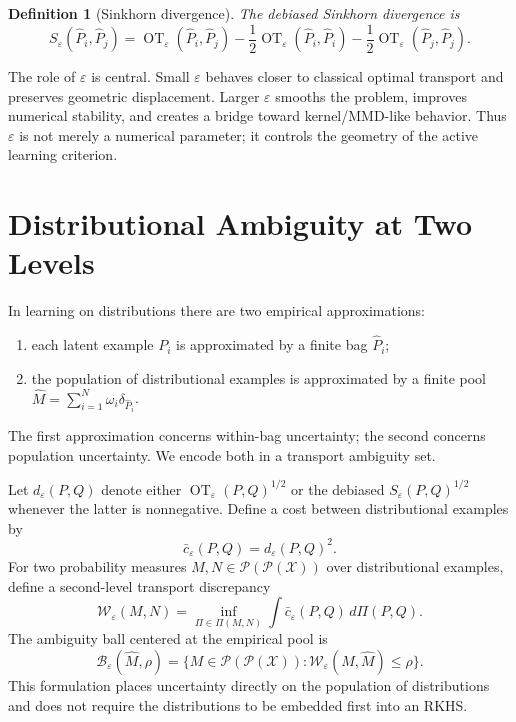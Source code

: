 \documentclass[11pt,a4paper]{article}
\newtheorem{definition}{Definition}
\DeclareMathOperator{\OT}{OT}
\newcommand{\cX}{\mathcal{X}}
\newcommand{\cP}{\mathcal{P}}
\newcommand{\cB}{\mathcal{B}}
\begin{document}
\begin{definition}[Sinkhorn divergence]
The debiased Sinkhorn divergence is
\begin{equation}
S_\varepsilon(\widehat P_i,\widehat P_j)
=\OT_\varepsilon(\widehat P_i,\widehat P_j)
-\frac{1}{2}\OT_\varepsilon(\widehat P_i,\widehat P_i)
-\frac{1}{2}\OT_\varepsilon(\widehat P_j,\widehat P_j).
\label{eq:sinkhorn-divergence}
\end{equation}
\end{definition}

The role of $\varepsilon$ is central. Small $\varepsilon$ behaves closer to classical optimal transport and preserves geometric displacement. Larger $\varepsilon$ smooths the problem, improves numerical stability, and creates a bridge toward kernel/MMD-like behavior. Thus $\varepsilon$ is not merely a numerical parameter; it controls the geometry of the active learning criterion.

\section{Distributional Ambiguity at Two Levels}

In learning on distributions there are two empirical approximations:
\begin{enumerate}[leftmargin=1.4em]
    \item each latent example $P_i$ is approximated by a finite bag $\widehat P_i$;
    \item the population of distributional examples is approximated by a finite pool $\widehat M=\sum_{i=1}^N \omega_i\delta_{\widehat P_i}$.
\end{enumerate}
The first approximation concerns within-bag uncertainty; the second concerns population uncertainty. We encode both in a transport ambiguity set.

Let $d_\varepsilon(P,Q)$ denote either $\OT_\varepsilon(P,Q)^{1/2}$ or the debiased $S_\varepsilon(P,Q)^{1/2}$ whenever the latter is nonnegative. Define a cost between distributional examples by
\begin{equation}
\bar c_\varepsilon(P,Q)=d_\varepsilon(P,Q)^2.
\end{equation}
For two probability measures $M,N\in\cP(\cP(\cX))$ over distributional examples, define a second-level transport discrepancy
\begin{equation}
\mathcal{W}_{\varepsilon}(M,N)
=\inf_{\Pi\in\Pi(M,N)}\int \bar c_\varepsilon(P,Q)\,d\Pi(P,Q).
\label{eq:second-level-ot}
\end{equation}
The ambiguity ball centered at the empirical pool is
\begin{equation}
\cB_\varepsilon(\widehat M,\rho)=
\{M\in\cP(\cP(\cX)): \mathcal{W}_{\varepsilon}(M,\widehat M)\le \rho\}.
\label{eq:ambiguity-ball}
\end{equation}
This formulation places uncertainty directly on the population of distributions and does not require the distributions to be embedded first into an RKHS.
\end{document}
